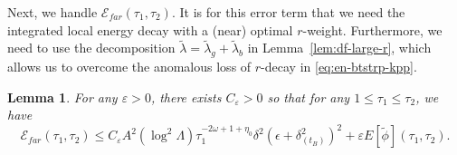 \documentclass[10pt, reqno]{amsart}
\newtheorem{lemma}[theorem]{Lemma}
\theoremstyle{definition}
\theoremstyle{remark}
\theoremstyle{conjecture}
\numberwithin{equation}{section}
\newcommand{\abs}[1]{\vert#1\vert}
\newcommand{\set}[1]{\{#1\}}
\newcommand{\ud}{\mathrm{d}}
\newcommand{\rd}{\partial}
\newcommand{\0}{\emptyset}
\newcommand{\dlt}{\delta}
\newcommand{\eps}{\epsilon}
\newcommand{\veps}{\varepsilon}
\newcommand{\lmb}{\lambda}
\newcommand{\Lmb}{\Lambda}
\newcommand{\omg}{\omega}
\newcommand{\calD}{\mathcal D}
\newcommand{\calE}{\mathcal E}
\newcommand{\dur}{\nu}
\newcommand{\dvr}{\lmb}
\newcommand{\phibg}{\overline{\phi}}				%
\newcommand{\dvrbg}{\overline{\dvr}}				%
\newcommand{\durbg}{\overline{\dur}}				%
\newcommand{\rbg}{\overline{r}}					%
\newcommand{\phidf}{\widetilde{\phi}}				%
\newcommand{\dvrdf}{\widetilde{\dvr}}				%
\newcommand{\Abs}[1]{\left\vert #1 \right\vert}
\begin{document}
Next, we handle $\calE_{far}(\tau_{1}, \tau_{2})$. It is for this error term that we need the integrated local energy decay with a (near) optimal $r$-weight. Furthermore, we need to use the decomposition $\dvrdf = \dvrdf_{g} + \dvrdf_{b}$ in Lemma~\ref{lem:df-large-r}, which allows us to overcome the anomalous loss of $r$-decay in \eqref{eq:en-btstrp-kpp}. 
\begin{lemma} \label{lem:en-err-far}
For any $\veps > 0$, there exists $C_{\veps} > 0$ so that for any $1 \leq \tau_{1} \leq \tau_{2}$, we have
\begin{equation} \label{eq:en-err-far}
	\calE_{far}(\tau_{1}, \tau_{2}) \leq C_{\veps} A^{2} (\log^{2} \Lmb) \tau_{1}^{-2 \omg + 1 + \eta_{0}} \dlt^{2} \left( \eps + \dlt_{(t_{B})}^{2} \right)^{2} + \veps E[\phidf](\tau_{1}, \tau_{2}).
\end{equation}
\end{lemma}
\end{document}
